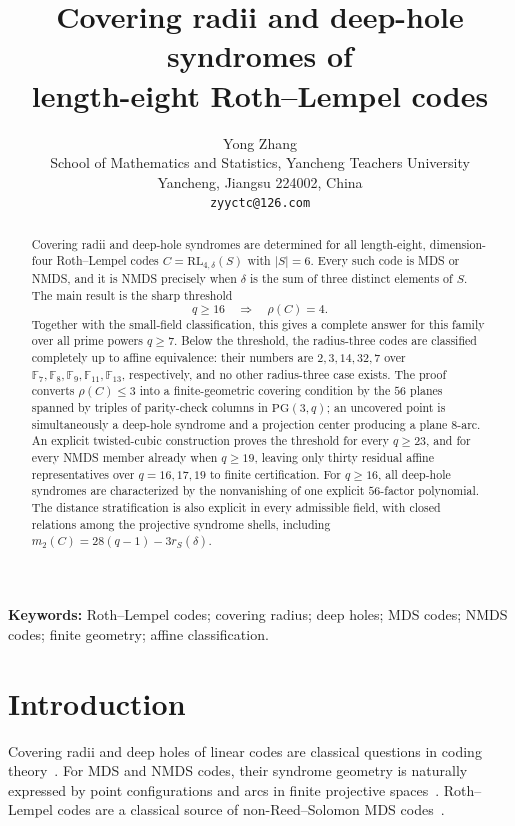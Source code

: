 ﻿\documentclass[11pt]{article}
\title{Covering radii and deep-hole syndromes of\\
length-eight Roth--Lempel codes}
\author{Yong Zhang\\
School of Mathematics and Statistics, Yancheng Teachers University\\
Yancheng, Jiangsu 224002, China\\
\texttt{zyyctc@126.com}
}
\date{}
\newcommand{\F}{\mathbb F}
\newcommand{\PG}{\mathrm{PG}}
\newcommand{\RL}{\mathrm{RL}}
\theoremstyle{plain}
\theoremstyle{definition}
\begin{document}
\maketitle

\begin{abstract}
Covering radii and deep-hole syndromes are determined for all length-eight,
dimension-four Roth--Lempel codes \(C=\RL_{4,\delta}(S)\) with \(|S|=6\).
Every such code is MDS or NMDS, and it is NMDS precisely when \(\delta\) is
the sum of three distinct elements of \(S\).  The main result is the sharp
threshold
\[
  q\ge16 \quad\Longrightarrow\quad \rho(C)=4 .
\]
Together with the small-field classification, this gives a complete answer
for this family over all prime powers \(q\ge7\).
Below the threshold, the radius-three codes are classified completely up to
affine equivalence: their numbers are \(2,3,14,32,7\) over
\(\F_7,\F_8,\F_9,\F_{11},\F_{13}\), respectively, and no other
radius-three case exists.  The proof converts \(\rho(C)\le3\) into a
finite-geometric covering condition by the \(56\) planes spanned by triples
of parity-check columns in \(\PG(3,q)\); an uncovered point is simultaneously
a deep-hole syndrome and a projection center producing a plane \(8\)-arc.
An explicit twisted-cubic construction proves the threshold for every
\(q\ge23\), and for every NMDS member already when \(q\ge19\), leaving only
thirty residual affine representatives over \(q=16,17,19\) to finite
certification.  For \(q\ge16\), all deep-hole syndromes are characterized by
the nonvanishing of one explicit \(56\)-factor polynomial.  The distance
stratification is also explicit in every admissible field, with closed
relations among the projective syndrome shells, including
\(m_2(C)=28(q-1)-3r_S(\delta)\).
\end{abstract}

\noindent\textbf{Keywords:}
Roth--Lempel codes; covering radius; deep holes; MDS codes; NMDS codes;
finite geometry; affine classification.

\section{Introduction}

Covering radii and deep holes of linear codes are classical questions in
coding theory~\cite{Cohen1997,Huffman2003,MWS1977}.  For MDS and NMDS codes,
their syndrome geometry is naturally expressed by point configurations and
arcs in finite projective spaces~\cite{Ball2015,DodunekovLandgev1995}.
Roth--Lempel codes are a classical source of non-Reed--Solomon MDS
codes~\cite{RothLempel1989}.
\end{document}
